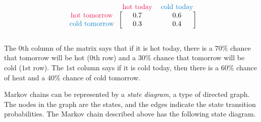 \begin{align*}
\begin{blockarray}{ccc}
& \text{\textcolor{red}{hot today}} & \text{\textcolor{blue}{cold today}} \\
\begin{block}{c[cc]}
\text{\textcolor{red}{hot tomorrow}}   & 0.7 & 0.6 \\
\text{\textcolor{blue}{cold tomorrow}} & 0.3 & 0.4 \\
\end{block}\end{blockarray}
\end{align*}

The $0$th column of the matrix says that if it is hot today, there is a $70\%$ chance that tomorrow will be hot ($0$th row) and a $30\%$ chance that tomorrow will be cold ($1$st row).
The $1$st column says if it is cold today, then there is a $60\%$ chance of heat and a $40\%$ chance of cold tomorrow.

Markov chains can be represented by a \emph{state diagram}, a type of directed graph.
The nodes in the graph are the states, and the edges indicate the state transition probabilities.
The Markov chain described above has the following state diagram.

\begin{figure}[H] %
\centering
{}
\end{figure}

